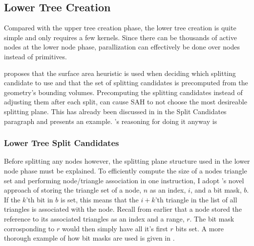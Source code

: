 \subsection{Lower Tree Creation}\label{sec:lowerNodes}

Compared with the upper tree creation phase, the lower tree creation is quite
simple and only requires a few kernels. Since there can be thousands of active
nodes at the lower node phase, parallization can effectively be done over nodes
instead of primitives.


\zhou{} proposes that the surface area heuristic is used when deciding which
splitting candidate to use and that the set of splitting candidates is
precomputed from the geometry's bounding volumes. Precomputing the splitting
candidates instead of adjusting them after each split, can cause SAH to not
choose the most desireable splitting plane. This has already been discussed in
 in the Split Candidates paragraph and
 presents an example. \zhou's reasoning for doing it
anyway is



\subsubsection{Lower Tree Split Candidates}


Before splitting any nodes however, the splitting plane structure used
in the lower node phase must be explained. To efficiently compute the
size of a nodes triangle set and performing node/triangle association
in one instruction, I adopt \zhou's novel approach of storing the
triangle set of a node, $n$ as an index, $i$, and a bit mask, $b$. If
the $k$'th bit in $b$ is set, this means that the $i+k$'th triangle in
the list of all triangles is associated with the node. Recall from
earlier that a node stored the reference to its associated triangles
as an index and a range, $r$. The bit mask corrosponding to $r$ would
then simply have all it's first $r$ bits set. A more thorough example
of how bit masks are used is given in .

